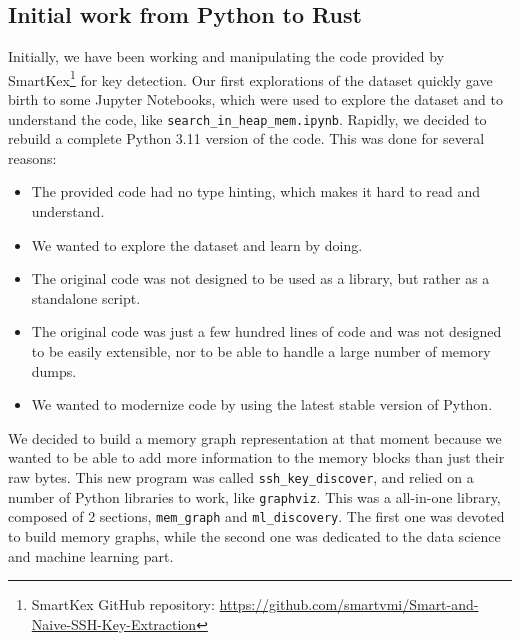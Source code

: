 \subsection{Initial work from Python to Rust}

Initially, we have been working and manipulating the code provided by SmartKex\footnote{SmartKex GitHub repository: \url{https://github.com/smartvmi/Smart-and-Naive-SSH-Key-Extraction}} for key detection. Our first explorations of the dataset quickly gave birth to some Jupyter Notebooks, which were used to explore the dataset and to understand the code, like \texttt{search\_in\_heap\_mem.ipynb}. Rapidly, we decided to rebuild a complete Python 3.11 version of the code. This was done for several reasons:

\begin{itemize}
    \item The provided code had no type hinting, which makes it hard to read and understand.
    \item We wanted to explore the dataset and learn by doing.
    \item The original code was not designed to be used as a library, but rather as a standalone script.
    \item The original code was just a few hundred lines of code and was not designed to be easily extensible, nor to be able to handle a large number of memory dumps.
    \item We wanted to modernize code by using the latest stable version of Python.
\end{itemize}

We decided to build a memory graph representation at that moment because we wanted to be able to add more information to the memory blocks than just their raw bytes. This new program was called \texttt{ssh\_key\_discover}, and relied on a number of Python libraries to work, like \texttt{graphviz}. This was a all-in-one library, composed of 2 sections, \texttt{mem\_graph} and \texttt{ml\_discovery}. The first one was devoted to build memory graphs, while the second one was dedicated to the data science and machine learning part.

